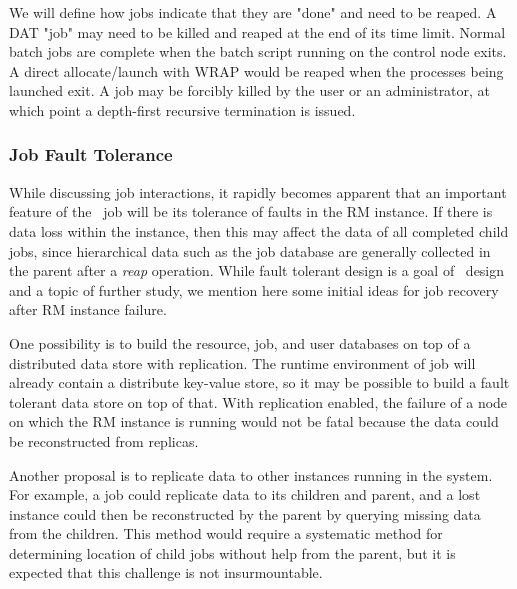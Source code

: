 We will define how jobs indicate that they are "done" and need to be
reaped. A DAT "job" may need to be killed and reaped at the end of its
time limit. Normal batch jobs are complete when the batch script
running on the control node exits. A direct allocate/launch with WRAP
would be reaped when the processes being launched exit. A job may
be forcibly killed by the user or an administrator, at which point
a depth-first recursive termination is issued.

\ifcomments
{}
\fi


\subsubsection{Job Fault Tolerance}

While discussing job interactions, it rapidly becomes apparent that
an important feature of the \ngrm\ job will be its tolerance of
faults in the RM instance. If there is data loss within the instance,
then this may affect the data of all completed child jobs, since
hierarchical data such as the job database are generally collected
in the parent after a \emph{reap} operation. While fault tolerant
design is a goal of \ngrm\ design and a topic of further study,
we mention here some initial ideas for job recovery after RM
instance failure.

One possibility is to build the resource, job, and user databases
on top of a distributed data store with replication. The runtime
environment of job will already contain a distribute key-value store,
so it may be possible to build a fault tolerant data store on
top of that. With replication enabled, the failure of a node
on which the RM instance is running would not be fatal because
the data could be reconstructed from replicas.

Another proposal is to replicate data to other instances running
in the system. For example, a job could replicate data to its
children and parent, and a lost instance could then be reconstructed
by the parent by querying missing data from the children. This
method would require a systematic method for determining location
of child jobs without help from the parent, but it is expected
that this challenge is not insurmountable.

